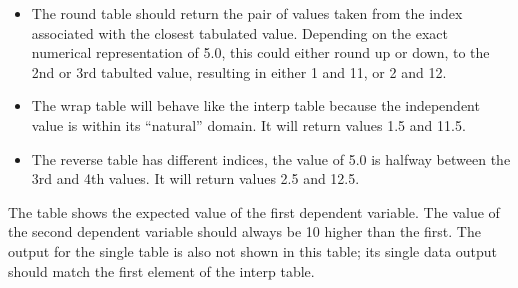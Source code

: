 \documentclass[11pt,fleqn]{report}
\begin{document}
\begin{itemize}
\begin{itemize}
    associated with the next higher tabulated value -- i.e. 6.0, the 3rd
    tabulated value -- and return 2 and 12.
    \item The round table should return the pair of values taken from the
    index
    associated with the closest tabulated value.  Depending on the exact
    numerical representation of 5.0, this could either round up or down,
    to the 2nd or 3rd tabulted value, resulting in either 1 and 11, or 2 and
    12.
    \item The wrap table will behave like the interp table because the
    independent value is within its ``natural'' domain.  It will return
    values 1.5 and 11.5.
    \item The reverse table has different indices, the value of 5.0 is
    halfway between the 3rd and 4th values.  It will return values 2.5
    and 12.5.
  \end{itemize}
\end {itemize}


The table shows the expected value of the first dependent variable.  The
value of the second dependent variable should always be 10 higher than the
first.  The output for the single table is also not shown in this table; its
single data output should match the first element of the interp table.

\clearpage
\end{document}
